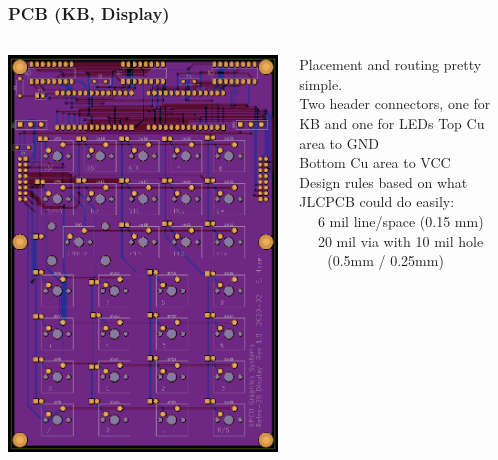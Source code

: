 \documentclass{beamer}
\newcommand{\tred}[1]{\textcolor{my-red}{#1}}
\newcommand{\tgreen}[1]{\textcolor{my-green}{#1}}
\newcommand{\tviolet}[1]{\textcolor{my-violet}{#1}}
\begin{document}
\begin{frame}
  \frametitle{PCB (KB, Display)}

  \vskip -0.2in
  \scriptsize
  \begin{columns}
    \includegraphics[width=\textwidth]{figs/led-gerbers.png}        
  
    Placement and routing pretty simple. \\
    Two header connectors, one for KB and one for LEDs
    \vskip 0.1in
    \tviolet{Top Cu area to GND} \\
    \tred{Bottom Cu area to VCC} \\
    \vskip 0.1in
    Design rules based on what JLCPCB could do easily: \\
    \tgreen{
    ~~ 6 mil line/space (0.15 mm)\\
    ~~ 20 mil via with 10 mil hole \\ ~~~~(0.5mm / 0.25mm)} \\
    \vskip 0.1in


\end{columns}
\end{frame}
\end{document}
